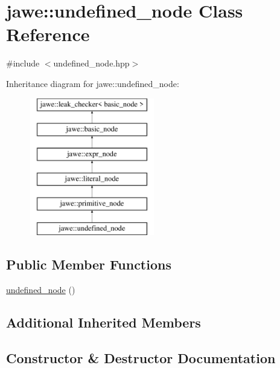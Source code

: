 \hypertarget{classjawe_1_1undefined__node}{}\section{jawe\+:\+:undefined\+\_\+node Class Reference}
\label{classjawe_1_1undefined__node}


{\ttfamily \#include $<$undefined\+\_\+node.\+hpp$>$}

Inheritance diagram for jawe\+:\+:undefined\+\_\+node\+:\begin{figure}[H]
\begin{center}
\leavevmode
\includegraphics[height=6.000000cm]{classjawe_1_1undefined__node}
\end{center}
\end{figure}
\subsection*{Public Member Functions}
\begin{DoxyCompactItemize}
\item 
\hyperlink{classjawe_1_1undefined__node_a99e5b079c7e97764d08cafea2c6d8e23}{undefined\+\_\+node} ()
\end{DoxyCompactItemize}
\subsection*{Additional Inherited Members}


\subsection{Constructor \& Destructor Documentation}
\mbox{\label{classjawe_1_1undefined__node_a99e5b079c7e97764d08cafea2c6d8e23}} 
